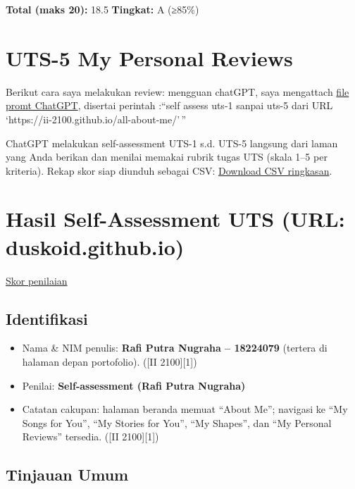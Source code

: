 \documentclass[
  letterpaper,
  DIV=11,
  numbers=noendperiod]{scrreprt}
\providecommand{\tightlist}{%
  \setlength{\itemsep}{0pt}\setlength{\parskip}{0pt}}\usepackage{longtable,booktabs,array}
\begin{document}
\textbf{Total (maks 20):} 18.5 \textbf{Tingkat:} A (≥85\%)


\chapter{UTS-5 My Personal Reviews}\label{uts-5-my-personal-reviews}

Berikut cara saya melakukan review: mengguan chatGPT, saya mengattach
\href{skor_uts.pdf}{file promt ChatGPT}, disertai perintah :``self
assess uts-1 sanpai uts-5 dari URL
`https://ii-2100.github.io/all-about-me/'\,''

ChatGPT melakukan self-assessment UTS-1 s.d. UTS-5 langsung dari laman
yang Anda berikan dan menilai memakai rubrik tugas UTS (skala 1--5 per
kriteria). Rekap skor siap diunduh sebagai CSV:
\href{sandbox:/mnt/data/UTS_self_assessment.csv}{Download CSV
ringkasan}.


\chapter{Hasil Self-Assessment UTS (URL:
duskoid.github.io)}\label{hasil-self-assessment-uts-url-duskoid.github.io}

\href{UTS-5_Skor.xlsx}{Skor penilaian}

\section{Identifikasi}\label{identifikasi}

\begin{itemize}
\tightlist
\item
  Nama \& NIM penulis: \textbf{Rafi Putra Nugraha -- 18224079} (tertera
  di halaman depan portofolio). ({[}II 2100{]}{[}1{]})
\item
  Penilai: \textbf{Self-assessment (Rafi Putra Nugraha)}
\item
  Catatan cakupan: halaman beranda memuat ``About Me''; navigasi ke ``My
  Songs for You'', ``My Stories for You'', ``My Shapes'', dan ``My
  Personal Reviews'' tersedia. ({[}II 2100{]}{[}1{]})
\end{itemize}

\section{Tinjauan Umum}\label{tinjauan-umum}
\end{document}

